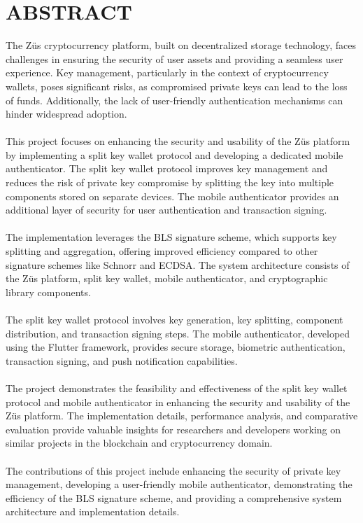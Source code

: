 \chapter*{ABSTRACT}
The Züs cryptocurrency platform, built on decentralized storage technology, faces challenges in ensuring the security of user assets and providing a seamless user experience. Key management, particularly in the context of cryptocurrency wallets, poses significant risks, as compromised private keys can lead to the loss of funds. Additionally, the lack of user-friendly authentication mechanisms can hinder widespread adoption. \\ \\
This project focuses on enhancing the security and usability of the Züs platform by implementing a split key wallet protocol and developing a dedicated mobile authenticator. The split key wallet protocol improves key management and reduces the risk of private key compromise by splitting the key into multiple components stored on separate devices. The mobile authenticator provides an additional layer of security for user authentication and transaction signing. \\ \\
The implementation leverages the BLS signature scheme, which supports key splitting and aggregation, offering improved efficiency compared to other signature schemes like Schnorr and ECDSA. The system architecture consists of the Züs platform, split key wallet, mobile authenticator, and cryptographic library components. \\ \\
The split key wallet protocol involves key generation, key splitting, component distribution, and transaction signing steps. The mobile authenticator, developed using the Flutter framework, provides secure storage, biometric authentication, transaction signing, and push notification capabilities. \\ \\
The project demonstrates the feasibility and effectiveness of the split key wallet protocol and mobile authenticator in enhancing the security and usability of the Züs platform. The implementation details, performance analysis, and comparative evaluation provide valuable insights for researchers and developers working on similar projects in the blockchain and cryptocurrency domain. \\ \\
The contributions of this project include enhancing the security of private key management, developing a user-friendly mobile authenticator, demonstrating the efficiency of the BLS signature scheme, and providing a comprehensive system architecture and implementation details. \\ \\
